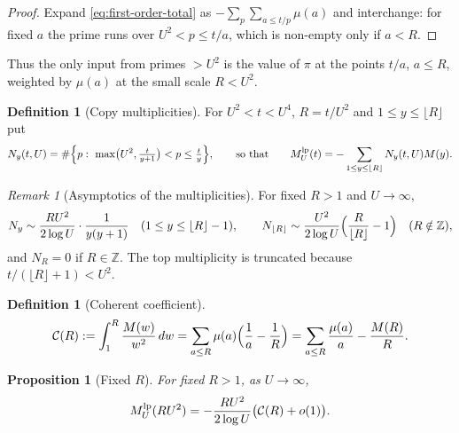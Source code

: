 \documentclass[11pt]{amsart}
\numberwithin{equation}{section}
\theoremstyle{plain}
\newtheorem{proposition}[theorem]{Proposition}
\theoremstyle{definition}
\newtheorem{definition}[theorem]{Definition}
\theoremstyle{remark}
\newtheorem{remark}[theorem]{Remark}
\newcommand{\Cc}{\mathcal{C}}
\begin{document}
\begin{proof}
Expand \eqref{eq:first-order-total} as $-\sum_{p}\sum_{a\le t/p}\mu(a)$ and
interchange: for fixed $a$ the prime runs over $U^2<p\le t/a$, which is
non-empty only if $a<R$.
\end{proof}

Thus the only input from primes $>U^2$ is the value of $\pi$ at the points
$t/a$, $a\le R$, weighted by $\mu(a)$ at the small scale $R<U^2$.

\begin{definition}[Copy multiplicities]
\label{def:copy-multiplicity}
For $U^2<t<U^4$, $R=t/U^2$ and $1\le y\le\lfloor R\rfloor$ put
\begin{equation}
\label{eq:Ny-exact}
  N_y(t,U)=\#\Bigl\{p:\ \max\bigl(U^2,\tfrac{t}{y+1}\bigr)<p\le\tfrac ty\Bigr\},
  \qquad\text{so that}\qquad
  M^{\rm lp}_U(t)=-\sum_{1\le y\le\lfloor R\rfloor}N_y(t,U)M(y).
\end{equation}
\end{definition}

\begin{remark}[Asymptotics of the multiplicities]
\label{rem:copy-count-asymptotic}
For fixed $R>1$ and $U\to\infty$,
\begin{equation}
\label{eq:Ny-fixed-R}
  N_y\sim\frac{RU^2}{2\log U}\cdot\frac1{y(y+1)}\quad(1\le y\le\lfloor R\rfloor-1),
  \qquad
  N_{\lfloor R\rfloor}\sim\frac{U^2}{2\log U}\Bigl(\frac R{\lfloor R\rfloor}-1\Bigr)
  \quad(R\notin\mathbb{Z}),
\end{equation}
and $N_R=0$ if $R\in\mathbb{Z}$. The top multiplicity is truncated because
$t/(\lfloor R\rfloor+1)<U^2$.
\end{remark}

\begin{definition}[Coherent coefficient]
\label{def:coherent_coefficient}
\begin{equation}
\label{eq:C_def}
  \Cc(R):=\int_1^R\frac{M(w)}{w^2}\,dw
  =\sum_{a\le R}\mu(a)\Bigl(\frac1a-\frac1R\Bigr)
  =\sum_{a\le R}\frac{\mu(a)}a-\frac{M(R)}R .
\end{equation}
\end{definition}

\begin{proposition}[Fixed $R$]
\label{prop:fixed_R_corrected}
For fixed $R>1$, as $U\to\infty$,
\begin{equation}
\label{eq:E_fixed_R}
  M^{\rm lp}_U(RU^2)=-\frac{RU^2}{2\log U}\bigl(\Cc(R)+o(1)\bigr).
\end{equation}
\end{proposition}
\end{document}
